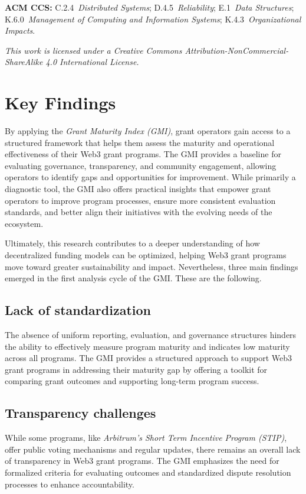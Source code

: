 \documentclass[a4,10pt]{article}
\begin{document}

\smallskip
\noindent \textbf{ACM CCS:}
C.2.4~\textit{Distributed Systems};
D.4.5~\textit{Reliability}; 
E.1~\textit{Data Structures};
K.6.0~\textit{Management of Computing and Information Systems}; 
K.4.3~\textit{Organizational Impacts}.


\smallskip
\noindent \textit{This work is licensed under a Creative Commons Attribution-NonCommercial-ShareAlike 4.0 International License.}

\section{Key Findings}\label{sec_1}
By applying the \textit{Grant Maturity Index (GMI)}, grant operators gain access to a structured framework that helps them assess the maturity and operational effectiveness of their Web3 grant programs. The GMI provides a baseline for evaluating governance, transparency, and community engagement, allowing operators to identify gaps and opportunities for improvement. While primarily a diagnostic tool, the GMI also offers practical insights that empower grant operators to improve program processes, ensure more consistent evaluation standards, and better align their initiatives with the evolving needs of the ecosystem.

Ultimately, this research contributes to a deeper understanding of how decentralized funding models can be optimized, helping Web3 grant programs move toward greater sustainability and impact. Nevertheless, three main findings emerged in the first analysis cycle of the GMI. These are the following.

\subsection*{Lack of standardization}\label{sec_1.1}
The absence of uniform reporting, evaluation, and governance structures hinders the ability to effectively measure program maturity and indicates low maturity across all programs. The GMI provides a structured approach to support Web3 grant programs in addressing their maturity gap by offering a toolkit for comparing grant outcomes and supporting long-term program success.

\subsection*{Transparency challenges}\label{sec_1.2}
While some programs, like \textit{Arbitrum's Short Term Incentive Program (STIP)}, offer public voting mechanisms and regular updates, there remains an overall lack of transparency in Web3 grant programs. The GMI emphasizes the need for formalized criteria for evaluating outcomes and standardized dispute resolution processes to enhance accountability.
\end{document}
